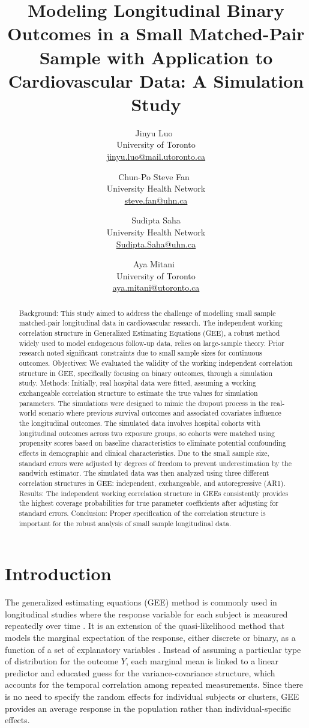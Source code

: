 \documentclass[
]{aft}
\title{Modeling Longitudinal Binary Outcomes in a Small Matched-Pair
Sample with Application to Cardiovascular Data: A Simulation Study}
\author{
Jinyu Luo~\orcidlink{0009-0004-1101-7040}\\University of
Toronto\\\href{mailto:jinyu.luo@mail.utoronto.ca}{jinyu.luo@mail.utoronto.ca}\and 
Chun-Po Steve Fan~\orcidlink{0000-0002-6373-0532}\\University Health
Network\\\href{mailto:steve.fan@uhn.ca}{steve.fan@uhn.ca}\and 
Sudipta Saha\\University Health
Network\\\href{mailto:Sudipta.Saha@uhn.ca}{Sudipta.Saha@uhn.ca}\and 
Aya Mitani~\orcidlink{0000-0002-0373-5032}\\University of
Toronto\\\href{mailto:aya.mitani@utoronto.ca}{aya.mitani@utoronto.ca}}
\date{}
\begin{document}
\maketitle
\begin{abstract}
Background: This study aimed to address the challenge of modelling small
sample matched-pair longitudinal data in cardiovascular research. The
independent working correlation structure in Generalized Estimating
Equations (GEE), a robust method widely used to model endogenous
follow-up data, relies on large-sample theory. Prior research noted
significant constraints due to small sample sizes for continuous
outcomes. Objectives: We evaluated the validity of the working
independent correlation structure in GEE, specifically focusing on
binary outcomes, through a simulation study. Methods: Initially, real
hospital data were fitted, assuming a working exchangeable correlation
structure to estimate the true values for simulation parameters. The
simulations were designed to mimic the dropout process in the real-world
scenario where previous survival outcomes and associated covariates
influence the longitudinal outcomes. The simulated data involves
hospital cohorts with longitudinal outcomes across two exposure groups,
so cohorts were matched using propensity scores based on baseline
characteristics to eliminate potential confounding effects in
demographic and clinical characteristics. Due to the small sample size,
standard errors were adjusted by degrees of freedom to prevent
underestimation by the sandwich estimator. The simulated data was then
analyzed using three different correlation structures in GEE:
independent, exchangeable, and autoregressive (AR1). Results: The
independent working correlation structure in GEEs consistently provides
the highest coverage probabilities for true parameter coefficients after
adjusting for standard errors. Conclusion: Proper specification of the
correlation structure is important for the robust analysis of small
sample longitudinal data.
\end{abstract}


\section{Introduction}\label{sec-intro}

The generalized estimating equations (GEE) method is commonly used in
longitudinal studies where the response variable for each subject is
measured repeatedly over time \citep{LiangZeger1986}. It is an extension
of the quasi-likelihood method that models the marginal expectation of
the response, either discrete or binary, as a function of a set of
explanatory variables \citep{Agresti2nd}. Instead of assuming a
particular type of distribution for the outcome \(Y\), each marginal
mean is linked to a linear predictor and educated guess for the
variance-covariance structure, which accounts for the temporal
correlation among repeated measurements. Since there is no need to
specify the random effects for individual subjects or clusters, GEE
provides an average response in the population rather than
individual-specific effects.
\end{document}
